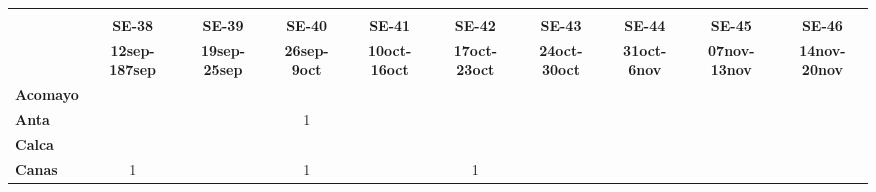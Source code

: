\begin{tabular}{lccccccccc}
	\textbf{}              & \multicolumn{1}{l}{}                        & \multicolumn{1}{l}{}      & \multicolumn{1}{l}{}                         & \multicolumn{1}{l}{}                         & \multicolumn{1}{l}{}                         & \multicolumn{1}{l}{}                        & \multicolumn{1}{l}{}                         & \multicolumn{1}{l}{}                         & \multicolumn{1}{l}{}     \\
	\textbf{}                                                               
	&\textbf{SE-38}                              &\textbf{SE-39}                   &\textbf{SE-40}                   
	&\textbf{SE-41}                              &\textbf{SE-42}                   &\textbf{SE-43}                  
	&\textbf{SE-44} 
	&\textbf{SE-45} 							&\textbf{SE-46} \\
	\textbf{}             &\textbf{12sep-187sep}&\textbf{19sep-25sep} 		   	   &\textbf{26sep-9oct} 
	&\textbf{10oct-16oct} &\textbf{17oct-23oct} &\textbf{24oct-30oct} 		       &\textbf{31oct-6nov}  			
	&\textbf{07nov-13nov} &\textbf{14nov-20nov}\\
	\textbf{Acomayo}                        	
	&\cellcolor[HTML]{FCC46C}         			&\cellcolor[HTML]{FCC46C}          &\cellcolor[HTML]{FCC46C}     	    &\cellcolor[HTML]{FCC46C}                   &\cellcolor[HTML]{FCC46C}          &\cellcolor[HTML]{FCC46C}                  
	&\cellcolor[HTML]{FCC46C}  			        &\cellcolor[HTML]{FCC46C}          &\cellcolor[HTML]{FCC46C} \\
	\textbf{Anta}                                                                    
	& \cellcolor[HTML]{FCC46C}                  &\cellcolor[HTML]{FCC46C}         &1                   					
	& \cellcolor[HTML]{FCC46C}                  &\cellcolor[HTML]{FCC46C}         &\cellcolor[HTML]{FCC46C} 			    
	& \cellcolor[HTML]{FCC46C} 				    &\cellcolor[HTML]{FCC46C}		  &\cellcolor[HTML]{FCC46C}\\
	\textbf{Calca}      				       
	&\cellcolor[HTML]{FCC46C}         			&\cellcolor[HTML]{FCC46C}         &\cellcolor[HTML]{FCC46C}       
	&\cellcolor[HTML]{FCC46C}                   &\cellcolor[HTML]{FCC46C}         &\cellcolor[HTML]{FCC46C}                
	&\cellcolor[HTML]{FCC46C}                   &\cellcolor[HTML]{FCC46C}  		  &\cellcolor[HTML]{FCC46C} \\                										
	\textbf{Canas}                              
	&1       									&\cellcolor[HTML]{FCC46C}         &1                   &\cellcolor[HTML]{FCC46C}                   &1        			              &\cellcolor[HTML]{FCC46C}                   &\cellcolor[HTML]{FCC46C} 					&\cellcolor[HTML]{FCC46C}         &\cellcolor[HTML]{FCC46C}\\

\end{tabular}
